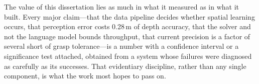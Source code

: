 The value of this dissertation lies as much in what it measured as in what it built. Every major claim---that the data pipeline decides whether spatial learning occurs, that perception error costs 0.28\,m of depth accuracy, that the solver and not the language model bounds throughput, that current precision is a factor of several short of grasp tolerance---is a number with a confidence interval or a significance test attached, obtained from a system whose failures were diagnosed as carefully as its successes. That evidentiary discipline, rather than any single component, is what the work most hopes to pass on.